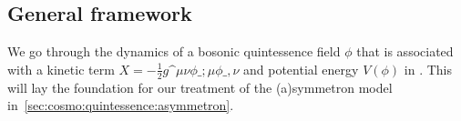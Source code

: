 \subsection{General framework}\label{sec:cosmo:quintessence:framework}
    We go through the dynamics of a bosonic quintessence field $\phi$ that is associated with a kinetic term $X=- \frac{1}{2} g\^{\mu\nu} \phi\_{;\mu}\phi\_{,\nu}$ and potential energy $V(\phi)$ in . This will lay the foundation for our treatment of the (a)symmetron model in~\cref{sec:cosmo:quintessence:asymmetron}.



